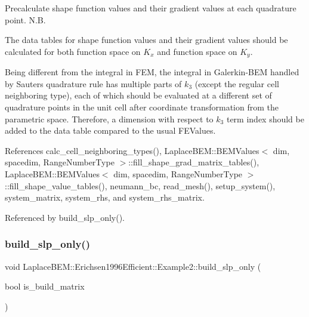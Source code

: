 Precalculate shape function values and their gradient values at each quadrature point. N.\+B.


\begin{DoxyEnumerate}
\item The data tables for shape function values and their gradient values should be calculated for both function space on $K_x$ and function space on $K_y$.
\item Being different from the integral in F\+EM, the integral in Galerkin-\/\+B\+EM handled by Sauter\textquotesingle{}s quadrature rule has multiple parts of $k_3$ (except the regular cell neighboring type), each of which should be evaluated at a different set of quadrature points in the unit cell after coordinate transformation from the parametric space. Therefore, a dimension with respect to $k_3$ term index should be added to the data table compared to the usual {\ttfamily F\+E\+Values}.
\end{DoxyEnumerate}

References calc\+\_\+cell\+\_\+neighboring\+\_\+types(), Laplace\+B\+E\+M\+::\+B\+E\+M\+Values$<$ dim, spacedim, Range\+Number\+Type $>$\+::fill\+\_\+shape\+\_\+grad\+\_\+matrix\+\_\+tables(), Laplace\+B\+E\+M\+::\+B\+E\+M\+Values$<$ dim, spacedim, Range\+Number\+Type $>$\+::fill\+\_\+shape\+\_\+value\+\_\+tables(), neumann\+\_\+bc, read\+\_\+mesh(), setup\+\_\+system(), system\+\_\+matrix, system\+\_\+rhs, and system\+\_\+rhs\+\_\+matrix.



Referenced by build\+\_\+slp\+\_\+only().

\mbox{\label{classLaplaceBEM_1_1Erichsen1996Efficient_1_1Example2_a4eda45fd98684daa5f951e74c27f0d84}} 
\subsubsection{\texorpdfstring{build\+\_\+slp\+\_\+only()}{build\_slp\_only()}}
{\footnotesize\ttfamily void Laplace\+B\+E\+M\+::\+Erichsen1996\+Efficient\+::\+Example2\+::build\+\_\+slp\+\_\+only (\begin{DoxyParamCaption}\item[{bool}]{is\+\_\+build\+\_\+matrix }\end{DoxyParamCaption})}

